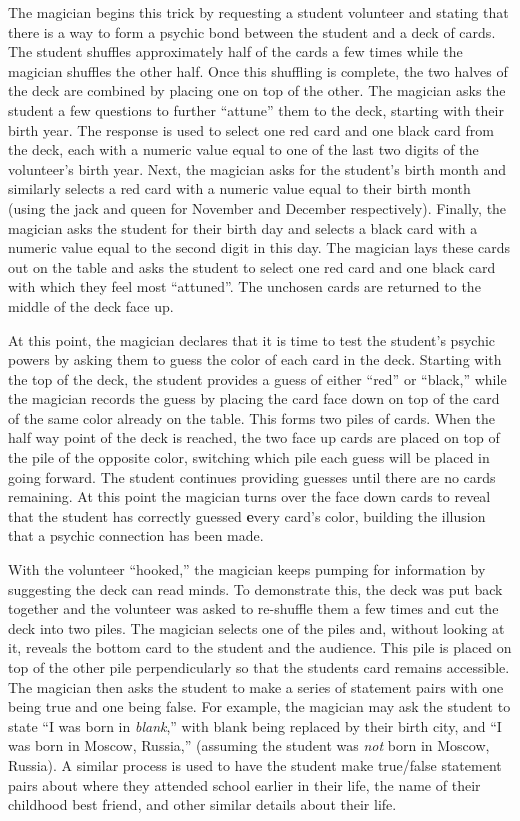 The magician begins this trick by requesting a student volunteer and stating
that there is a way to form a psychic bond between the student and a deck of
cards.  The student shuffles
approximately
half of the cards a few times while the magician shuffles the other half.  Once
this shuffling is complete, the two halves of the deck are combined by placing
one on top of the other.
The magician asks the student
a few questions to further ``attune'' them to the deck,
starting with their birth year.
The response
is used to select one red card and one black card from the deck,
each with a numeric value equal to one of the last two digits of
the volunteer's birth year.
Next, the magician asks for the student's birth month and similarly selects
a red card with a numeric value equal
to their birth month (using the jack and queen for November and December
respectively).
Finally, the magician asks the student
for their birth day and selects a black card with a numeric value
equal to the second digit in this day.
The magician lays these cards out on the table and asks the student to select
one red card and one black card with which they feel most ``attuned''.
The unchosen cards are returned to the middle
of the deck face up.

At this point, the magician declares
that it is time to test the student's psychic powers by asking them to
guess the color of each card in the deck.  Starting with the top of the deck,
the student provides a guess of either ``red'' or ``black,''  while the magician
records the guess by placing the card face down on top of the card of the same
color already on the table.  This forms two piles of cards.  When the half way
point of the deck is reached, the two face up cards are placed on top of the
pile of the opposite color,
switching which pile each guess
will be placed in going forward.  The student continues providing guesses until
there are no cards remaining.  At this point the magician turns over the face
down cards to reveal that the student has correctly guessed {\textbf every}
card's color, building the illusion that a psychic connection has been made.

With the volunteer ``hooked,'' the magician keeps pumping for information by
suggesting the deck can read minds.
To demonstrate this,
the deck was put back together and the volunteer was asked to re-shuffle them
a few times and cut the deck into two piles.
The magician
selects one of the piles and, without looking at it,
reveals the bottom card to the student and the
audience.
This pile is placed on top of the other pile perpendicularly so that
the students card remains accessible.  The magician then asks the student to
make a series of statement pairs with one being true and one being false.  For
example,  the magician may ask the student to state  ``I was born in
\textit{blank},'' with blank being replaced by their birth city, and ``I was
born in Moscow, Russia,'' (assuming the student was \textit{not} born in Moscow,
Russia).  A similar process is used to have the student make true/false
statement pairs about where they attended school earlier in their life, the name
of their childhood best friend, and other similar details about their life.


